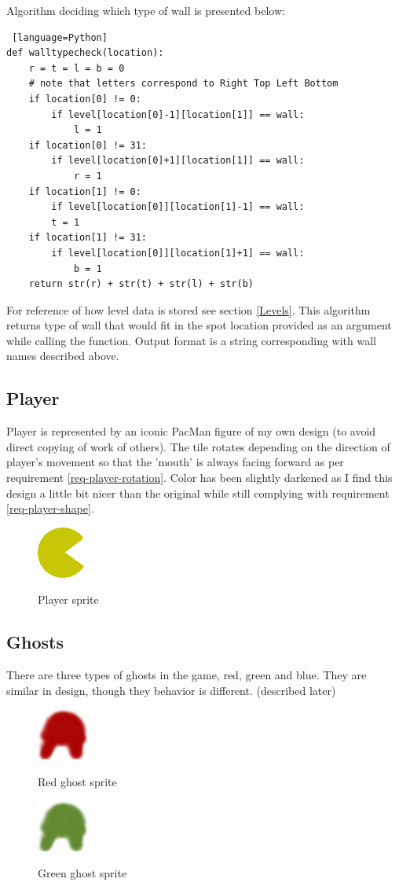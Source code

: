 \documentclass[11pt,a4paper,notitlepage]{report}
\newcommand{\dsubsection}[1]{\FloatBarrier \subsection{#1}}
\newenvironment{img}{
	\begin{center}
		\begin{figure}[H]
			\begin{center}
			
}{
	\end{center}
		\end{figure}
			\end{center}
}
\begin{document}
				Algorithm deciding which type of wall is presented below:
				\label{walltypecheck}
				\begin{lstlisting} [language=Python]
def walltypecheck(location):
	r = t = l = b = 0
	# note that letters correspond to Right Top Left Bottom
	if location[0] != 0:
		if level[location[0]-1][location[1]] == wall:
			l = 1
	if location[0] != 31:
		if level[location[0]+1][location[1]] == wall:
			r = 1
	if location[1] != 0:
		if level[location[0]][location[1]-1] == wall:
		t = 1
	if location[1] != 31:
		if level[location[0]][location[1]+1] == wall:
			b = 1
	return str(r) + str(t) + str(l) + str(b)
				\end{lstlisting}
				For reference of how level data is stored see section \ref{Levels}.
				This algorithm returns type of wall that would fit in the spot location provided as an argument while calling the function. Output format is a string corresponding with wall names described above.
			\dsubsection{Player}
				Player is represented by an iconic PacMan figure of my own design (to avoid direct copying of work of others). The tile rotates depending on the direction of player's movement so that the 'mouth' is always facing forward as per requirement \ref{req-player-rotation}. Color has been slightly darkened as I find this design a little bit nicer than the original while still complying with requirement \ref{req-player-shape}. 
				\begin{img}
					\includegraphics{images/player}\\
				\caption{Player sprite}
				\end{img}
			\dsubsection{Ghosts}
				There are three types of ghosts in the game, red, green and blue. They are similar in design, though they behavior is different. (described later)
				 \begin{img}
				 	\includegraphics{images/redghost}\\
				 	\caption{Red ghost sprite}
				 	\label{ghostimage}
				 \end{img}
				  \begin{img}
				 	\includegraphics{images/greenghost}\\
				 	\caption{Green ghost sprite}
				 \end{img}
\end{document}
